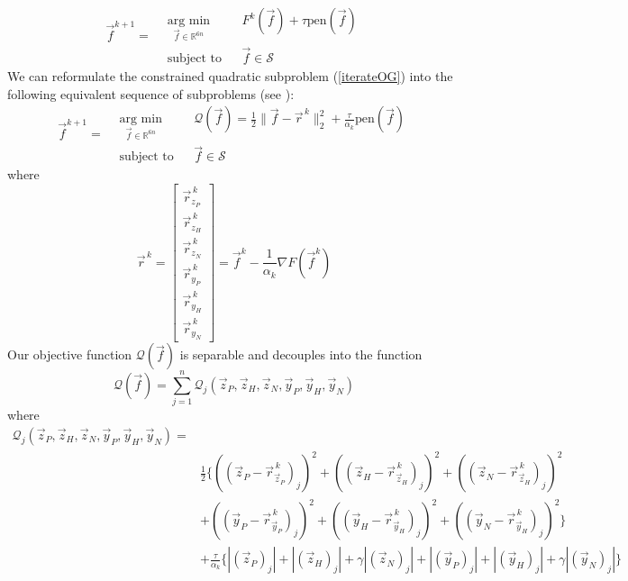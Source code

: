 \documentclass{article}
\def\R{\mathbb{R}} %
\newcommand{\zP}{\vec{z}_P }
\newcommand{\zH}{\vec{z}_H }
\newcommand{\zN}{\vec{z}_N }
\newcommand{\yP}{\vec{y}_P }
\newcommand{\yH}{\vec{y}_H }
\newcommand{\yN}{\vec{y}_N }
\begin{document}
\begin{equation} \label{iterateOG}
	\vec{f}^{k+1} = 
	\begin{aligned}
		& \underset{\vec{f} \in \R^{6n}}{\text{arg min}}
		& & F^k(\vec{f}) + \tau \text{pen}(\vec{f}) \\
		& \text{subject to}
		& & \vec{f} \in \mathcal{S}
	\end{aligned}
\end{equation}
We can reformulate the constrained quadratic subproblem (\ref{iterateOG}) into the following equivalent sequence of subproblems (see \cite{Marcia_SPIRALTAP}):
\begin{equation} \label{subproblemIterate}
	\vec{f}^{k+1} = 
	\begin{aligned}
		& \underset{\vec{f} \in \R^{6n}}{\text{arg min}}
		& & \mathcal{Q}(\vec{f})= \frac{1}{2}\|\vec{f} - \vec{r}^{\,k}\|_2^2 + \frac{\tau}{\alpha_k} \text{pen}(\vec{f}) \\
		& \text{subject to}
		& & \vec{f} \in \mathcal{S}
	\end{aligned}
\end{equation}
where 
\renewcommand{\arraystretch}{1.4}
\begin{equation*}
	\vec{r}^{\,k} = 
	\begin{bmatrix}
		\vec{r}_{z_P}^{\,k} \\ \vec{r}_{z_H}^{\,k} \\ \vec{r}_{z_N}^{\,k}\\
		\vec{r}_{y_P}^{\,k} \\ \vec{r}_{y_H}^{\,k} \\ \vec{r}_{y_N}^{\,k}
	\end{bmatrix} 
	= \vec{f}^k - \frac{1}{\alpha_k} \nabla F(\vec{f}^k)
\end{equation*}
Our objective function $\mathcal{Q}(\vec{f})$ is separable and decouples into the function
$$ \mathcal{Q}(\vec{f}) = \sum_{j=1}^{n} \mathcal{Q}_j(\zP, \zH, \zN, \yP, \yH, \yN)$$
where 
\begin{align*}
	\mathcal{Q}_j(\zP, \zH, \zN, \yP, \yH, \yN) =& \\
	& \frac{1}{2}\Bigg\{
	((\zP - \vec{r}_{\zP}^{\, k})_j)^2 + 
	((\zH - \vec{r}_{\zH}^{\, k})_j)^2 +
	((\zN - \vec{r}_{\zH}^{\, k})_j)^2 \\ & + 
	((\yP - \vec{r}_{\yP}^{\, k})_j)^2 + 
	((\yH - \vec{r}_{\yH}^{\, k})_j)^2 +
	((\yN - \vec{r}_{\yH}^{\, k})_j)^2 \Bigg\} \\ &+
	\frac{\tau}{\alpha_k} \Big\{ |(\zP)_j| + 
	|(\zH)_j| + \gamma |(\zN)_j| + |(\yP)_j| + 
	|(\yH)_j| + \gamma |(\yN)_j|\Big\}
\end{align*}
\end{document}
